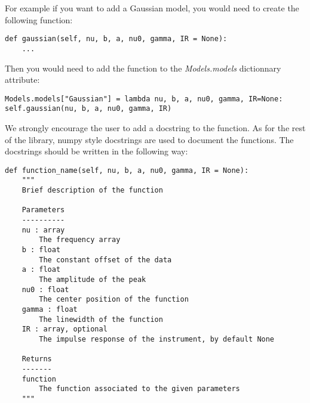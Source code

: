 For example if you want to add a Gaussian model, you would need to create the following function:
\begin{lstlisting}
def gaussian(self, nu, b, a, nu0, gamma, IR = None):
    ...
\end{lstlisting}

Then you would need to add the function to the \textit{Models.models} dictionnary attribute:
\begin{lstlisting}
Models.models["Gaussian"] = lambda nu, b, a, nu0, gamma, IR=None: self.gaussian(nu, b, a, nu0, gamma, IR)
\end{lstlisting}

We strongly encourage the user to add a docstring to the function. As for the rest of the library, numpy style docstrings are used to document the functions. The docstrings should be written in the following way:

\begin{lstlisting}
def function_name(self, nu, b, a, nu0, gamma, IR = None):
    """
    Brief description of the function

    Parameters
    ----------
    nu : array
        The frequency array
    b : float
        The constant offset of the data
    a : float
        The amplitude of the peak
    nu0 : float
        The center position of the function
    gamma : float
        The linewidth of the function
    IR : array, optional
        The impulse response of the instrument, by default None

    Returns
    -------
    function
        The function associated to the given parameters
    """
\end{lstlisting}
